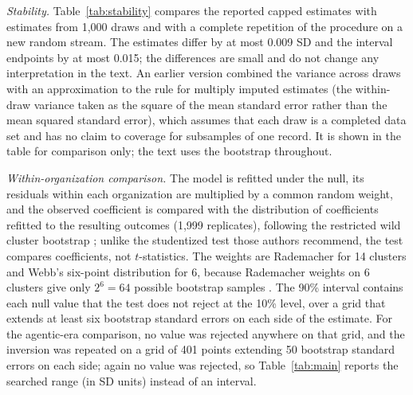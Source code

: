 \documentclass[acmsmall,screen,review,anonymous]{acmart}
\begin{document}
\textit{Stability.} Table~\ref{tab:stability} compares the reported capped estimates with estimates from 1,000 draws and with a complete repetition of the procedure on a new random stream. The estimates differ by at most 0.009 SD and the interval endpoints by at most 0.015; the differences are small and do not change any interpretation in the text. An earlier version combined the variance across draws with an approximation to the rule for multiply imputed estimates \citep{rubin1987imputation} (the within-draw variance taken as the square of the mean standard error rather than the mean squared standard error), which assumes that each draw is a completed data set and has no claim to coverage for subsamples of one record. It is shown in the table for comparison only; the text uses the bootstrap throughout.



\textit{Within-organization comparison.} The model is refitted under the null, its residuals within each organization are multiplied by a common random weight, and the observed coefficient is compared with the distribution of coefficients refitted to the resulting outcomes (1,999 replicates), following the restricted wild cluster bootstrap \citep{cameron2008bootstrap, roodman2019boottest}; unlike the studentized test those authors recommend, the test compares coefficients, not $t$-statistics. The weights are Rademacher for 14 clusters and Webb's six-point distribution for 6, because Rademacher weights on 6 clusters give only $2^6 = 64$ possible bootstrap samples \citep{webb2023reworking, roodman2019boottest}. The 90\% interval contains each null value that the test does not reject at the 10\% level, over a grid that extends at least six bootstrap standard errors on each side of the estimate. For the agentic-era comparison, no value was rejected anywhere on that grid, and the inversion was repeated on a grid of 401 points extending 50 bootstrap standard errors on each side; again no value was rejected, so Table~\ref{tab:main} reports the searched range (in SD units) instead of an interval.
\end{document}
